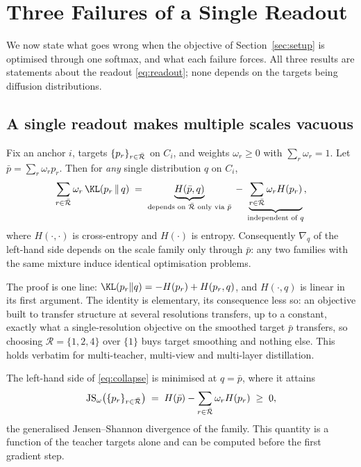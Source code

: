 \section{Three Failures of a Single Readout}
\label{sec:analysis}

We now state what goes wrong when the objective of Section~\ref{sec:setup} is optimised
through one softmax, and what each failure forces. All three results are statements about
the readout \eqref{eq:readout}; none depends on the targets being diffusion distributions.

\subsection{A single readout makes multiple scales vacuous}
\label{sec:collapse}

\begin{proposition}[Collapse]
\label{prop:collapse}
Fix an anchor $i$, targets $\{p_r\}_{r\in\bar{\mathcal{R}}}$ on $C_i$, and weights $\omega_r\geq0$ with
$\sum_r\omega_r=1$. Let $\bar p = \sum_{r}\omega_r p_r$. Then for \emph{any} single
distribution $q$ on $C_i$,
\begin{equation}
    \sum_{r\in\Rset}\omega_r\,\KL\!\left(p_r \,\Vert\, q\right)
    \;=\;
    \underbrace{H(\bar p, q)}_{\text{depends on }\Rset\text{ only via }\bar p}
    \;-\;
    \underbrace{\sum_{r\in\Rset}\omega_r H(p_r)}_{\text{independent of }q},
    \label{eq:collapse}
\end{equation}
where $H(\cdot,\cdot)$ is cross-entropy and $H(\cdot)$ is entropy. Consequently
$\nabla_q$ of the left-hand side depends on the scale family only through $\bar p$: any
two families with the same mixture induce identical optimisation problems.
\end{proposition}

The proof is one line: $\KL(p_r\Vert q) = -H(p_r) + H(p_r,q)$, and $H(\cdot,q)$ is linear in
its first argument. The identity is elementary, its consequence less so: an objective built
to transfer structure at several resolutions transfers, up to a constant, exactly what a
single-resolution objective on the smoothed target $\bar p$ transfers, so choosing
$\mathcal{R}=\{1,2,4\}$ over $\{1\}$ buys target smoothing and nothing else. This holds
verbatim for multi-teacher, multi-view and multi-layer distillation.

\begin{corollary}
\label{cor:floor}
The left-hand side of \eqref{eq:collapse} is minimised at $q=\bar p$, where it attains
\begin{equation}
    \mathrm{JS}_\omega\!\left(\{p_r\}_{r\in\bar{\mathcal{R}}}\right)
    \;=\;
    H(\bar p) - \sum_{r\in\bar{\mathcal{R}}}\omega_r H(p_r) \;\geq\; 0,
    \label{eq:floor}
\end{equation}
the generalised Jensen--Shannon divergence of the family. This quantity is a function of
the teacher targets alone and can be computed before the first gradient step.
\end{corollary}

